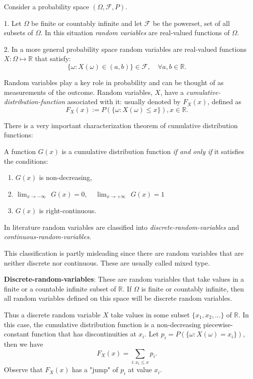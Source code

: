 
Consider a probability space $(\Omega,\mathcal{F},P)$.

1. Let $\Omega$ be finite or countably infinite and let $\mathcal{F}$ be the powerset, set of all subsets of $\Omega$. In this situation \textit{random variables} are real-valued functions of $\Omega$.

2. In a more general probability space random variables are real-valued functions $X:\Omega \mapsto \mathbb{R}$ that satisfy:
$$\{\omega: X(\omega) \in (a,b)\} \in \mathcal{F}, \quad \forall a,b \in \mathbb{R}.$$

Random variables play a key role in probability and can be thought of as measurements of the outcome. Random variables, $X$, have a \textit{cumulative-distribution-function} associated with it: usually denoted by $F_X(x)$, defined as
$$ F_X(x):= P(\{\omega: X(\omega)\leq x\}), x \in \mathbb{R}.$$

There is a very important characterization theorem of cumulative distribution functions:

A function $G(x)$ is a cumulative distribution function \textit{if and only if} it satisfies the conditions:
\begin{enumerate}[$(i)$]
\item $G(x)$ is non-decreasing,
\item $\lim_{x \to -\infty} ~~ G(x) = 0, ~~~~~ \lim_{x \to +\infty} ~~ G(x) = 1$
\item $G(x)$ is right-continuous.
\end{enumerate}




In literature random variables are classified into \textit{discrete-random-variables} and \textit{continuous-random-variables}.

\begin{remark}
This classification is partly misleading since there are random variables that are neither discrete nor continuous. These are usually called mixed type.
\end{remark}

\textbf{Discrete-random-variables}: These are random variables that take values in a finite or a countable infinite subset of $\mathbb{R}$. If $\Omega$ is finite or countably infinite, then all random variables defined on this space will be discrete random variables.

Thus a discrete random variable $X$ take values in some subset $\{x_1, x_2, ...\}$ of $\mathbb{R}$. In this case, the cumulative distribution function is a non-decreasing piecewise-constant function that has discontinuities at $x_i$. Let $p_i = P(\{\omega:X(\omega)=x_i\})$, then we have
$$ F_X(x) = \sum_{i:x_i \leq x} p_i.$$
Observe that $F_X(x)$ has a "jump" of $p_i$ at value $x_i$.

